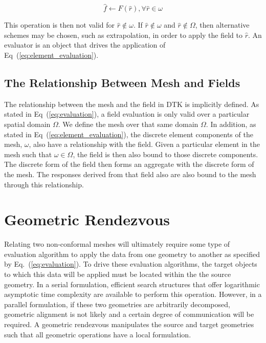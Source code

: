 \documentclass[letterpaper,12pt]{article}
\begin{document}
\begin{equation}
  \hat{f} \leftarrow F(\hat{r}), \forall \hat{r} \in \omega
  \label{eq:element_evaluation}
\end{equation}

This operation is then not valid for $\hat{r} \notin \omega$. If
$\hat{r} \notin \omega$ and $\hat{r} \notin \Omega$, then alternative
schemes may be chosen, such as extrapolation, in order to apply the
field to $\hat{r}$. An evaluator is an object that drives the
application of Eq~(\ref{eq:element_evaluation}).

\subsection{The Relationship Between Mesh and Fields}
\label{subsec:mesh_and_fields}
The relationship between the mesh and the field in DTK is implicitly
defined. As stated in Eq~(\ref{eq:evaluation}), a field evaluation is
only valid over a particular spatial domain $\Omega$. We define the
mesh over that same domain $\Omega$. In addition, as stated in
Eq~(\ref{eq:element_evaluation}), the discrete element components of
the mesh, $\omega$, also have a relationship with the field. Given a
particular element in the mesh such that $\omega \in \Omega$, the
field is then also bound to those discrete components. The discrete
form of the field then forms an aggregate with the discrete form of
the mesh. The responses derived from that field also are also bound to
the mesh through this relationship.

\clearpage

\section{Geometric Rendezvous}\label{sec:rendezvous}
Relating two non-conformal meshes will ultimately require some type of
evaluation algorithm to apply the data from one geometry to another as
specified by Eq.~(\ref{eq:evaluation}). To drive these evaluation
algorithms, the target objects to which this data will be applied must
be located within the the source geometry. In a serial formulation,
efficient search structures that offer logarithmic asymptotic time
complexity are available to perform this operation. However, in a
parallel formulation, if these two geometries are arbitrarily
decomposed, geometric alignment is not likely and a certain degree of
communication will be required. A geometric rendezvous manipulates the
source and target geometries such that all geometric operations have a
local formulation.
\end{document}
